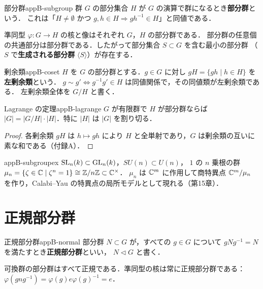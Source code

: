 \begin{mydef}{部分群}{appB-subgroup}
群 $G$ の部分集合 $H$ が $G$ の演算で群になるとき\textbf{部分群}という．
これは「$H\ne\emptyset$ かつ $g,h\in H\Rightarrow gh^{-1}\in H$」と同値である．
\end{mydef}

準同型 $\varphi\colon G\to H$ の核と像はそれぞれ $G$，$H$ の部分群である．
部分群の任意個の共通部分は部分群である．したがって部分集合 $S\subset G$ を含む最小の部分群
（$S$ で\textbf{生成される部分群} $\langle S\rangle$）が存在する．

\begin{mydef}{剰余類}{appB-coset}
$H$ を $G$ の部分群とする．$g\in G$ に対し $gH=\{gh\mid h\in H\}$ を\textbf{左剰余類}という．
$g\sim g'\iff g^{-1}g'\in H$ は同値関係で，その同値類が左剰余類である．
左剰余類全体を $G/H$ と書く．
\end{mydef}

\begin{mythm}{Lagrange の定理}{appB-lagrange}
$G$ が有限群で $H$ が部分群ならば $|G|=|G/H|\cdot|H|$．特に $|H|$ は $|G|$ を割り切る．
\end{mythm}
\begin{proof}
各剰余類 $gH$ は $h\mapsto gh$ により $H$ と全単射であり，$G$ は剰余類の互いに素な和である（付録A）．
\end{proof}

\begin{myex}{}{appB-subgroupex}
$\operatorname{SL}_n(k)\subset\operatorname{GL}_n(k)$，$SU(n)\subset U(n)$，
$1$ の $n$ 乗根の群 $\mu_n=\{\zeta\in\mathbb{C}\mid\zeta^n=1\}\cong\mathbb{Z}/n\mathbb{Z}\subset\mathbb{C}^\times$．
$\mu_n$ は $\mathbb{C}^m$ に作用して商特異点 $\mathbb{C}^m/\mu_n$ を作り，Calabi–Yau の特異点の局所モデルとして現れる（第15章）．
\end{myex}

\section{正規部分群}

\begin{mydef}{正規部分群}{appB-normal}
部分群 $N\subset G$ が，すべての $g\in G$ について $gNg^{-1}=N$ を満たすとき\textbf{正規部分群}といい，
$N\triangleleft G$ と書く．
\end{mydef}

可換群の部分群はすべて正規である．準同型の核は常に正規部分群である：
$\varphi(gng^{-1})=\varphi(g)e\varphi(g)^{-1}=e$．

